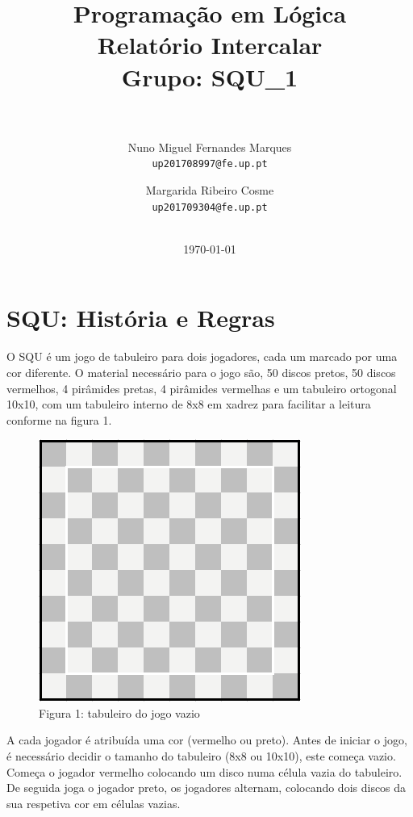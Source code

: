 \documentclass[11pt]{article}
\title{
\large{\textbf{Programação em Lógica\\ Relatório Intercalar \\}
Grupo: SQU\_1 \\ \vspace{1cm}\\}}
\author{
  Nuno Miguel Fernandes Marques\\
  \texttt{up201708997@fe.up.pt}
  \and
  Margarida Ribeiro Cosme\\
  \texttt{up201709304@fe.up.pt}
  \\ \vspace{1cm}\\
  }
\date{\today}
\begin{document}
\maketitle
\thispagestyle{empty}

\newpage
\thispagestyle{fancy}
\fancyhf{}
\fancyfoot[R]{\thepage}
\renewcommand*{\footrulewidth}{1pt}

\section*{SQU: História e Regras}

\setlength{\parindent}{2ex} 
O SQU é um jogo de tabuleiro para dois jogadores, cada um marcado por uma cor diferente. O material necessário para o jogo são, 50 discos pretos, 50 discos vermelhos, 4 pirâmides pretas, 4 pirâmides vermelhas e um tabuleiro ortogonal 10x10, com um tabuleiro interno de 8x8 em xadrez para facilitar a leitura conforme na figura 1.

\begin{figure}[h]
 \begin{center}
\includegraphics[scale=0.44]{fig1.png}
\caption*{Figura 1: tabuleiro do jogo vazio}
\end{center}
\end{figure}

A cada jogador é atribuída uma cor (vermelho ou preto). Antes de iniciar o jogo, é necessário decidir o tamanho do tabuleiro (8x8 ou 10x10), este começa vazio. Começa o jogador vermelho colocando um disco numa célula vazia do tabuleiro. De seguida joga o jogador preto, os jogadores alternam, colocando dois discos da sua respetiva cor em células vazias.\\
\end{document}
